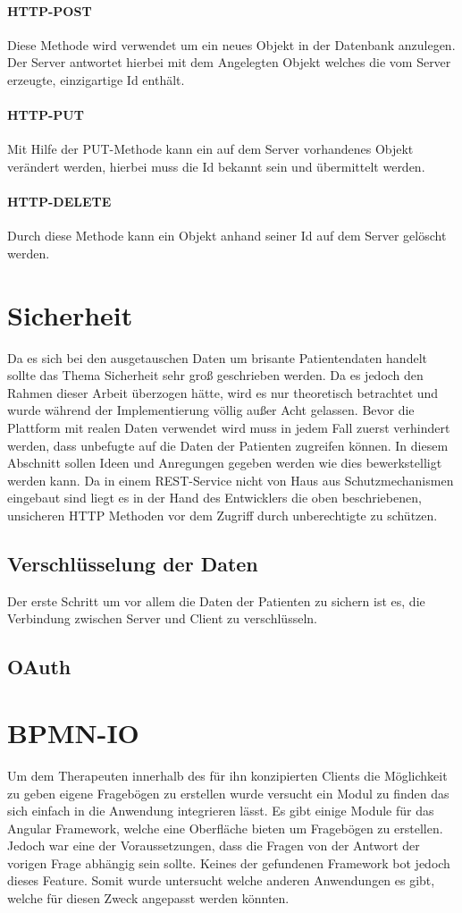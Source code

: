 \paragraph{HTTP-POST}
Diese Methode wird verwendet um ein neues Objekt in der Datenbank anzulegen. Der Server antwortet hierbei mit dem Angelegten Objekt welches die vom Server erzeugte, einzigartige Id enthält.
\paragraph{HTTP-PUT}
Mit Hilfe der PUT-Methode kann ein auf dem Server vorhandenes Objekt verändert werden, hierbei muss die Id bekannt sein und übermittelt werden.
\paragraph{HTTP-DELETE}
Durch diese Methode kann ein Objekt anhand seiner Id auf dem Server gelöscht werden.

\section{Sicherheit}
Da es sich bei den ausgetauschen Daten um brisante Patientendaten handelt sollte das Thema Sicherheit sehr groß geschrieben werden. Da es jedoch den Rahmen dieser Arbeit überzogen hätte, wird es nur theoretisch betrachtet und wurde während der Implementierung völlig außer Acht gelassen. Bevor die Plattform mit realen Daten verwendet wird muss in jedem Fall zuerst verhindert werden, dass unbefugte auf die Daten der Patienten zugreifen können. In diesem Abschnitt sollen Ideen und Anregungen gegeben werden wie dies bewerkstelligt werden kann. 
Da in einem REST-Service nicht von Haus aus Schutzmechanismen eingebaut sind liegt es in der Hand des Entwicklers die oben beschriebenen, unsicheren HTTP Methoden vor dem Zugriff durch unberechtigte zu schützen.
\subsection{Verschlüsselung der Daten}
Der erste Schritt um vor allem die Daten der Patienten zu sichern ist es, die Verbindung zwischen Server und Client zu verschlüsseln. 
\subsection{OAuth}


\section{BPMN-IO}
Um dem Therapeuten innerhalb des für ihn konzipierten Clients die Möglichkeit zu geben eigene Fragebögen zu erstellen wurde versucht ein Modul zu finden das sich einfach in die Anwendung integrieren lässt. Es gibt einige Module für das Angular Framework, welche eine Oberfläche bieten um Fragebögen zu erstellen. Jedoch war eine der Voraussetzungen, dass die Fragen von der Antwort der vorigen Frage abhängig sein sollte. Keines der gefundenen Framework bot jedoch dieses Feature. Somit wurde untersucht welche anderen Anwendungen es gibt, welche für diesen Zweck angepasst werden könnten.
